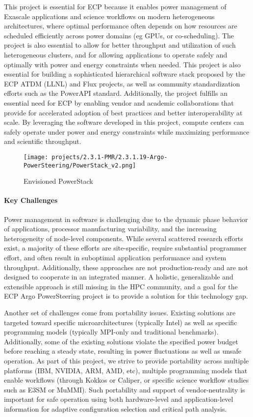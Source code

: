 This project is essential for ECP because it enables power management of Exascale applications and science workflows on modern heterogeneous architectures, where optimal performance often depends on how resources are scheduled efficiently across power domains (eg GPUs, or co-scheduling). The project is also essential to allow for better throughput and utilization of such heterogeneous clusters, and for allowing applications to operate safely and optimally with power and energy constraints when needed. This project is also essential for building a sophisticated hierarchical software stack proposed by the ECP ATDM (LLNL) and Flux projects, as well as community standardization efforts such as the PowerAPI standard. Additionally, the project fulfills an essential need for ECP by enabling vendor and academic collaborations that provide for accelerated adoption of best practices and better interoperability at scale. By leveraging the software developed in this project, compute centers can safely operate under power and energy constraints while maximizing performance and scientific throughput. 

\begin{figure}[t]
	\centering
	\texttt{[image: projects/2.3.1-PMR/2.3.1.19-Argo-PowerSteering/PowerStack\_v2.png]}
	\caption{Envisioned PowerStack}
	\label{fig:pstack}
\end{figure}


\paragraph{Key Challenges}
Power management in software is challenging due to the dynamic phase behavior of applications, processor manufacturing variability, and the increasing heterogeneity of node-level components. While several scattered research efforts exist, a majority of these efforts are site-specific, require substantial programmer effort, and often result in suboptimal application performance and system throughput. Additionally, these approaches are not production-ready and are not designed to cooperate in an integrated manner. A holistic, generalizable and extensible approach is still missing in the HPC community, and a goal for the ECP Argo PowerSteering project is to provide a solution for this technology gap. 

Another set of challenges come from portability issues. Existing solutions are targeted toward specific microarchitectures (typically Intel) as well as specific programming models (typically MPI-only and traditional benchmarks). Additionally, some of the existing solutions violate the specified power budget before reaching a steady state, resulting in power fluctuations as well as unsafe operation. As part of this project, we strive to provide portability across multiple platforms (IBM, NVIDIA, ARM, AMD, etc), multiple programming models that enable workflows (through Kokkos or Caliper, or specific science workflow studies such as E3SM or MuMMI). Such portability and support of vendor-neutrality is important for safe operation using both hardware-level and application-level information for adaptive configuration selection and critical path analysis.

